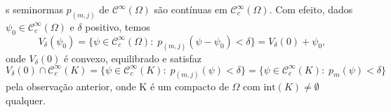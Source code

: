 \documentclass[../distribution_theory_notes.tex]{subfiles}
\begin{document}
     \begin{tcolorbox}[
     skin=enhanced,
     title=Observação,
     fonttitle=\bfseries,
   colframe=black,
     colbacktitle=cyan!75!white, 
     colback=cyan!15,
     colbacklower=black,
   coltitle=black,
     drop fuzzy shadow,
     ]
     s seminormas \(p_{(m, j)}\) de \(\mathcal{C}^{\infty}(\Omega )\) são contínuas em \(\mathcal{C}_{c}^{\infty}(\Omega )\). Com efeito, dados \(\psi_{0}\in \mathcal{C}_{c}^{\infty}(\Omega )\) e \(\delta \) positivo, temos 
       \[
         V_{\delta }(\psi_{0})=\{\psi \in \mathcal{C}_{c}^{\infty}(\Omega ):\; p_{(m, j)}(\psi -\psi_{0})<\delta \}=V_{\delta }(0)+\psi_{0},
       \]
       onde \(V_{\delta }(0)\) é convexo, equilibrado e satisfaz 
         \[
           V_{\delta }(0)\cap \mathcal{C}_{c}^{\infty}(K)=\{\psi \in \mathcal{C}_{c}^{\infty}(K):\; p_{(m, j)}(\psi )<\delta \}=\{\psi \in \mathcal{C}_{c}^{\infty}(K):\; p_{m}(\psi )<\delta \}
         \]
         pela observação anterior, onde K é um compacto de \(\Omega \) com \(\mathrm{int}(K)\neq\emptyset\) qualquer.
     \end{tcolorbox}
\end{document}
